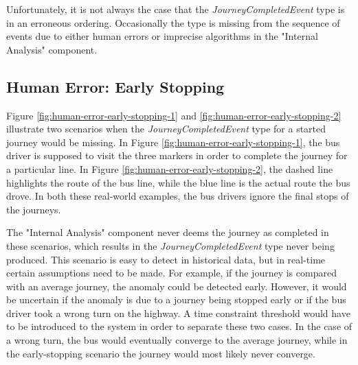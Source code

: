 Unfortunately, it is not always the case that the \textit{JourneyCompletedEvent} type is in an erroneous ordering.
Occasionally the type is missing from the sequence of events due to either human errors or imprecise algorithms in the "Internal Analysis" component.

\subsection{Human Error: Early Stopping}
Figure \ref{fig:human-error-early-stopping-1} and \ref{fig:human-error-early-stopping-2} illustrate two scenarios when the \textit{JourneyCompletedEvent} type for a started journey would be missing.
In Figure \ref{fig:human-error-early-stopping-1}, the bus driver is supposed to visit the three markers in order to complete the journey for a particular line.
In Figure \ref{fig:human-error-early-stopping-2}, the dashed line highlights the route of the bus line, while the blue line is the actual route the bus drove.
In both these real-world examples, the bus drivers ignore the final stops of the journeys.

The "Internal Analysis" component never deems the journey as completed in these scenarios, which results in the \textit{JourneyCompletedEvent} type never being produced.
This scenario is easy to detect in historical data, but in real-time certain assumptions need to be made.
For example, if the journey is compared with an average journey, the anomaly could be detected early.
However, it would be uncertain if the anomaly is due to a journey being stopped early or if the bus driver took a wrong turn on the highway.
A time constraint threshold would have to be introduced to the system in order to separate these two cases.
In the case of a wrong turn, the bus would eventually converge to the average journey, while in the early-stopping scenario the journey would most likely never converge.

